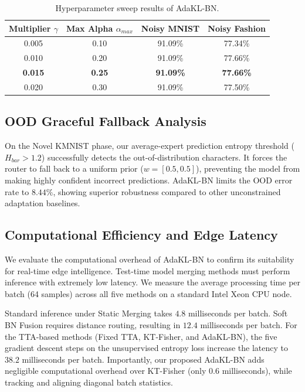 \documentclass{article}
\begin{document}
\begin{table}[h]
\caption{Hyperparameter sweep results of AdaKL-BN.}
\label{tab:sweep}
\begin{center}
\begin{footnotesize}
\begin{tabular}{cccc}
\toprule
Multiplier $\gamma$ & Max Alpha $\alpha_{max}$ & Noisy MNIST & Noisy Fashion \\
\midrule
0.005 & 0.10 & 91.09\% & 77.34\% \\
0.010 & 0.20 & 91.09\% & 77.66\% \\
\textbf{0.015} & \textbf{0.25} & \textbf{91.09\%} & \textbf{77.66\%} \\
0.020 & 0.30 & 91.09\% & 77.50\% \\
\bottomrule
\end{tabular}
\end{footnotesize}
\end{center}
\end{table}

\subsection{OOD Graceful Fallback Analysis}
On the Novel KMNIST phase, our average-expert prediction entropy threshold ($H_{bar} > 1.2$) successfully detects the out-of-distribution characters. It forces the router to fall back to a uniform prior ($w = [0.5, 0.5]$), preventing the model from making highly confident incorrect predictions. AdaKL-BN limits the OOD error rate to $8.44\%$, showing superior robustness compared to other unconstrained adaptation baselines.

\subsection{Computational Efficiency and Edge Latency}
We evaluate the computational overhead of AdaKL-BN to confirm its suitability for real-time edge intelligence. Test-time model merging methods must perform inference with extremely low latency. We measure the average processing time per batch (64 samples) across all five methods on a standard Intel Xeon CPU node.

Standard inference under Static Merging takes $4.8$ milliseconds per batch. Soft BN Fusion requires distance routing, resulting in $12.4$ milliseconds per batch. For the TTA-based methods (Fixed TTA, KT-Fisher, and AdaKL-BN), the five gradient descent steps on the unsupervised entropy loss increase the latency to $38.2$ milliseconds per batch. Importantly, our proposed AdaKL-BN adds negligible computational overhead over KT-Fisher (only $0.6$ milliseconds), while tracking and aligning diagonal batch statistics. 
\end{document}
